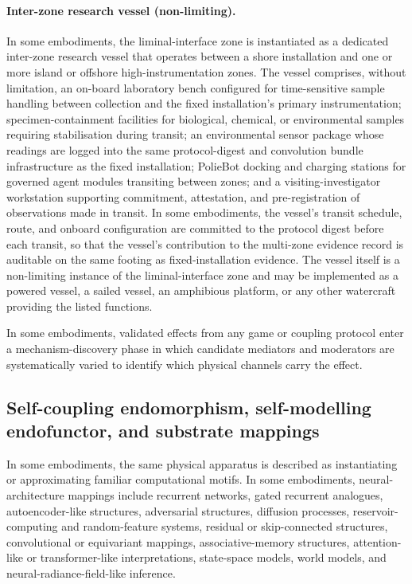 \documentclass[a4paper,12pt]{article}
\newcommand{\cb}{convolution bundle\xspace}
\begin{document}
\paragraph{Inter-zone research vessel (non-limiting).}
In some embodiments, the liminal-interface zone is instantiated
as a dedicated inter-zone research vessel that operates between a
shore installation and one or more island or offshore
high-instrumentation zones. The vessel comprises, without
limitation, an on-board laboratory bench configured for
time-sensitive sample handling between collection and the fixed
installation's primary instrumentation; specimen-containment
facilities for biological, chemical, or environmental samples
requiring stabilisation during transit; an environmental sensor
package whose readings are logged into the same protocol-digest
and \cb infrastructure as the fixed installation; PolieBot
docking and charging stations for governed agent modules
transiting between zones; and a visiting-investigator workstation
supporting commitment, attestation, and pre-registration of
observations made in transit. In some embodiments, the vessel's
transit schedule, route, and onboard configuration are committed
to the protocol digest before each transit, so that the vessel's
contribution to the multi-zone evidence record is auditable on
the same footing as fixed-installation evidence. The vessel
itself is a non-limiting instance of the liminal-interface zone
and may be implemented as a powered vessel, a sailed vessel, an
amphibious platform, or any other watercraft providing the
listed functions.

In some embodiments, validated effects from any game or coupling
protocol enter a mechanism-discovery phase in which candidate
mediators and moderators are systematically varied to identify which
physical channels carry the effect.

\subsection{Self-coupling endomorphism, self-modelling endofunctor,
  and substrate mappings}


In some embodiments, the same physical apparatus is described as
instantiating or approximating familiar computational motifs. In some
embodiments, neural-architecture mappings include recurrent networks,
gated recurrent analogues, autoencoder-like structures, adversarial
structures, diffusion processes, reservoir-computing and
random-feature systems, residual or skip-connected structures,
convolutional or equivariant mappings, associative-memory structures,
attention-like or transformer-like interpretations, state-space
models, world models, and neural-radiance-field-like inference.
\end{document}
